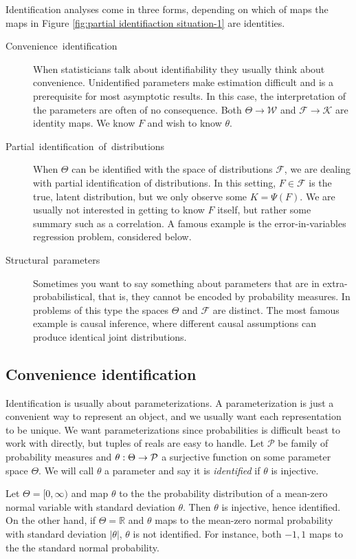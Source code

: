 Identification analyses come in three forms, depending on which of maps the maps in Figure \ref{fig:partial identifiaction situation-1} are identities. 
\begin{description}
\item [{Convenience~identification}] When statisticians talk about identifiability they usually think about convenience. Unidentified parameters make estimation difficult and is a prerequisite for most asymptotic results. In this case, the interpretation of the parameters are often of no consequence. Both $\Theta\to\mathcal{W}$ and $\mathcal{F}\to\mathcal{K}$ are identity maps. We know $F$ and wish to know $\theta$. 
\item [{Partial~identification~of~distributions}] When $\Theta$ can be identified with the space of distributions $\mathcal{F}$, we are dealing with partial identification of distributions. In this setting, $F\in\mathcal{F}$ is the true, latent distribution, but we only observe some $K=\Psi(F)$. We are usually not interested in getting to know $F$ itself, but rather some summary such as a correlation. A famous example is the error-in-variables regression problem, considered below.
\item [{Structural~parameters}] Sometimes you want to say something about parameters that are in extra-probabilistical, that is, they cannot be encoded by probability measures. In problems of this type the spaces $\Theta$ and $\mathcal{F}$ are distinct. The most famous example is causal inference, where different causal assumptions can produce identical joint distributions. 
\end{description}

\subsection{Convenience identification}

Identification is usually about parameterizations. A parameterization is just a convenient way to represent an object, and we usually want each representation to be unique. We want parameterizations since probabilities is difficult beast to work with directly, but tuples of reals are easy to handle. Let $\mathcal{P}$ be family of probability measures and $\theta:\text{\ensuremath{\Theta\to\mathcal{P}}}$ a surjective function on some parameter space $\Theta$. We will call $\theta$ a parameter and say it is\emph{ identified }if $\theta$ is injective. 
\begin{example}
\label{exa:normal unidentified}Let $\Theta=[0,\infty)$ and map $\theta$ to the the probability distribution of a mean-zero normal variable with standard deviation $\theta$. Then $\theta$ is injective, hence identified. On the other hand, if $\Theta=\mathbb{R}$ and $\theta$ maps to the mean-zero normal probability with standard deviation $|\theta|$, $\theta$ is not identified. For instance, both $-1,1$ maps to the the standard normal probability.
\end{example}

